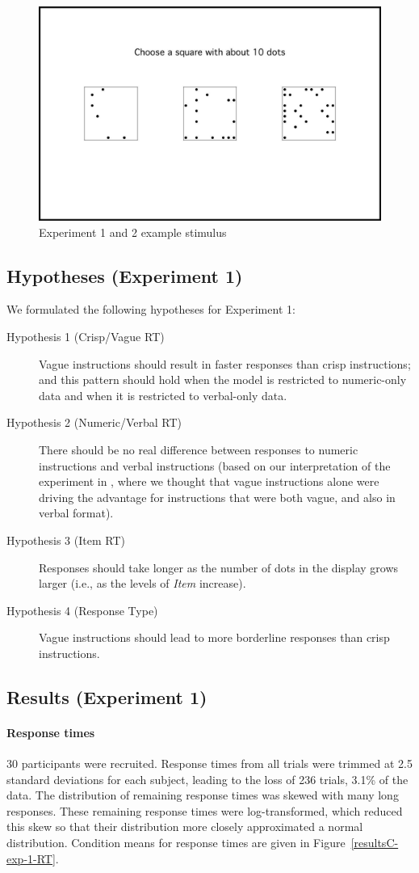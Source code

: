 \documentclass[ %
  graybox       %
 ,envcountchap  %
 ,sectrefs      %
]{svmono}
\begin{document}
\begin{figure}[htbp]
\centering
\includegraphics[width=.75\textwidth]{figures/Ce1-example-screenshot-border}
\caption{Experiment 1 and 2 example stimulus}
\label{Experiment1and2examplestimulus}
\end{figure}

\subsection{Hypotheses (Experiment 1)}
We formulated the following hypotheses for Experiment 1:
\begin{description}
	\item [Hypothesis 1 (Crisp/Vague RT)] Vague instructions should result in faster responses than crisp instructions; and this pattern should hold when the model is restricted to numeric-only data and when it is restricted to verbal-only data.
	\item [Hypothesis 2 (Numeric/Verbal RT)] There should be no real difference between responses to numeric instructions and verbal instructions (based on our interpretation of the experiment in \citet{green2013utility}, where we thought that vague instructions alone were driving the advantage for instructions that were both vague, and also in verbal format).
	\item [Hypothesis 3 (Item RT)] Responses should take longer as the number of dots in the display grows larger (i.e., as the levels of \emph{Item} increase).
	\item [Hypothesis 4 (Response Type)] Vague instructions should lead to more borderline responses than crisp instructions.
\end{description}

\subsection{Results (Experiment 1)}
\paragraph{\textbf{Response times}}
30 participants were recruited. Response times from all trials were trimmed at 2.5 standard deviations for each subject, leading to the loss of 236 trials, 3.1\% of the data. The distribution of remaining response times was skewed with many long responses. These remaining response times were log-transformed, which reduced this skew so that their distribution more closely approximated a normal distribution. Condition means for response times are given in Figure~\ref{resultsC-exp-1-RT}.
\end{document}
